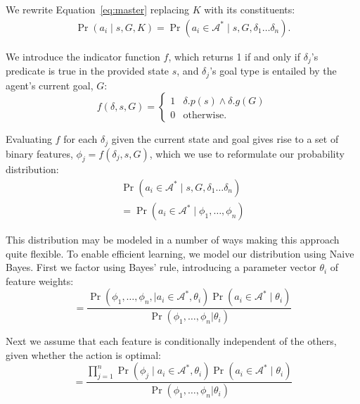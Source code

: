 \documentclass[letterpaper]{article}
\begin{document}
We rewrite Equation~\ref{eq:master} replacing $K$ with its constituents:
\begin{multline}
\Pr(a_i \mid s, G, K)
= \Pr(a_i \in \mathcal{A}^* \mid s, G, \delta_1 \ldots \delta_n).
\end{multline}

We introduce the indicator function $f$, which returns 1 if and only if $\delta_j$'s predicate is true in the provided state $s$, and $\delta_j$'s goal type is entailed by the agent's current goal, $G$:
\begin{equation}
f(\delta, s, G) = 
\begin{cases}
1& \delta.p(s) \wedge \delta.g(G) \\
0& \text{otherwise.}
\end{cases}
\label{eq:f_func_def}
\end{equation}

Evaluating $f$ for each $\delta_j$ given the current state and goal gives rise to a set of binary features,
$\phi_j = f(\delta_j, s, G)$, which we use to reformulate our probability distribution:
\begin{multline}
\Pr(a_i \in \mathcal{A}^*  \mid s, G, \delta_1 \ldots \delta_n) \\
= \Pr(a_i \in \mathcal{A}^*  \mid \phi_1, \ldots, \phi_n)
\label{eq:feature_rep}
\end{multline}


This distribution may be modeled in a number of ways making this
approach quite flexible. To enable efficient learning, we model our
distribution using Naive Bayes. First we factor using Bayes' rule,
introducing a parameter vector $\theta_i$ of feature weights:
\begin{equation}
= \frac{\Pr(\phi_1, \ldots, \phi_{n}, \mid a_i \in \mathcal{A}^*, \theta_i) \Pr(a_i \in \mathcal{A}^* \mid \theta_i)}{\Pr(\phi_1, \ldots, \phi_{n} | \theta_i)}
\label{eq:bayes}
\end{equation}

Next we assume that each feature is conditionally independent of the others, given whether the action is optimal:
\begin{equation}
= \frac{\prod_{j=1}^{n} \Pr(\phi_j \mid a_i \in \mathcal{A}^*, \theta_i) \Pr(a_i \in \mathcal{A}^* \mid \theta_i) }{\Pr(\phi_1, \ldots, \phi_{n} | \theta_i)}
\label{eq:final}
\end{equation}
\end{document}
